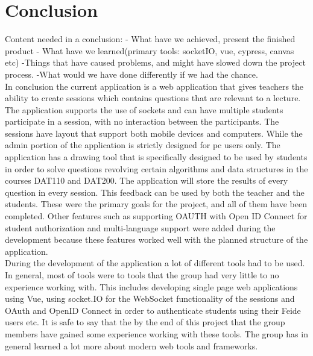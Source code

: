 \section{Conclusion}
Content needed in a conclusion:
- What have we achieved, present the finished product
- What have we learned(primary tools: socketIO, vue, cypress, canvas etc)
-Things that have caused problems, and might have slowed down the project process.
-What would we have done differently if we had the chance.
\\[11pt]
In conclusion the current application is a web application that gives teachers the ability to create sessions which contains questions that are relevant to a lecture. The application supports the use of sockets and can have multiple students participate in a session, with no interaction between the participants.  The sessions have layout that support both mobile devices and computers. While the admin portion of the application is strictly designed for pc users only. The application has a drawing tool that is specifically designed to be used by students in order to solve questions revolving certain algorithms and data structures in the courses DAT110 and DAT200. The application will store the results of every question in every session. This feedback can be used by both the teacher and the students. These were the primary goals for the project, and all of them have been completed. Other features such as supporting OAUTH with Open ID Connect for student authorization and multi-language support were added during the development because these features worked well with the planned structure of the application. \\[11pt]
During the development of the application a lot of different tools had to be used. In general, most of tools were to tools that the group had very little to no experience working with. This includes developing single page web applications using Vue, using socket.IO for the WebSocket functionality of the sessions and OAuth and OpenID Connect in order to authenticate students using their Feide users etc. It is safe to say that the by the end of this project that the group members have gained some experience working with these tools. The group has in general learned a lot more about modern web tools and frameworks. \\[11pt]
